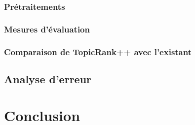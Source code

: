      \subsubsection{Prétraitements}
      \label{subsubsec:main-automatic_keyphrase_annotation-supervised_automatic_keyphrase_annotation-evaluation-preprocessing}
      
      \subsubsection{Mesures d'évaluation}
      \label{subsubsec:main-automatic_keyphrase_annotation-supervised_automatic_keyphrase_annotation-evaluation-evaluation_measures}
      
      \subsubsection{Comparaison de TopicRank++ avec l'existant}
      \label{subsubsec:main-automatic_keyphrase_annotation-supervised_automatic_keyphrase_annotation-evaluation-comparison}

    \subsection{Analyse d'erreur}
    \label{subsec:main-automatic_keyphrase_annotation-supervised_automatic_keyphrase_annotation-error_analysis}


  \section{Conclusion}
  \label{sec:main-automatic_keyphrase_annotation-conclusion}

